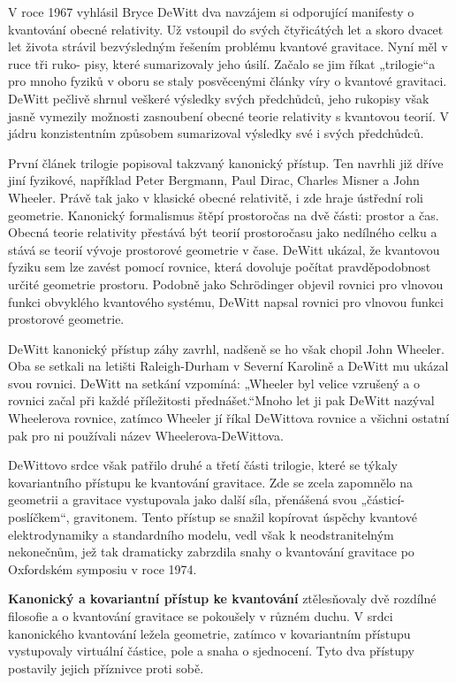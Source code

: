   V roce 1967 vyhlásil Bryce DeWitt dva navzájem si odporující manifesty o kvantování obecné
  relativity. Už vstoupil do svých čtyřicátých let a skoro dvacet let života strávil bezvýsledným
  řešením problému kvantové gravitace. Nyní měl v ruce tři ruko- pisy, které sumarizovaly jeho
  úsilí. Začalo se jim říkat „trilogie“a pro mnoho fyziků v oboru se staly posvěcenými články víry o
  kvantové gravitaci. DeWitt pečlivě shrnul veškeré výsledky svých předchůdců, jeho rukopisy však
  jasně vymezily možnosti zasnoubení obecné teorie relativity s kvantovou teorií. V jádru
  konzistentním způsobem sumarizoval výsledky své i svých předchůdců. 
  
  První článek trilogie popisoval takzvaný kanonický přístup. Ten navrhli již dříve jiní fyzikové,
  například Peter Bergmann, Paul Dirac, Charles Misner a John Wheeler. Právě tak jako v klasické
  obecné relativitě, i zde hraje ústřední roli geometrie. Kanonický formalismus štěpí prostoročas na
  dvě části: prostor a čas. Obecná teorie relativity přestává být teorií prostoročasu jako nedílného
  celku a stává se teorií vývoje prostorové geometrie v čase. DeWitt ukázal, že kvantovou fyziku sem
  lze zavést pomocí rovnice, která dovoluje počítat pravděpodobnost určité geometrie prostoru.
  Podobně jako Schrödinger objevil rovnici pro vlnovou funkci obvyklého kvantového systému, DeWitt
  napsal rovnici pro vlnovou funkci prostorové geometrie. 
  
  DeWitt kanonický přístup záhy zavrhl, nadšeně se ho však chopil John Wheeler. Oba se setkali na
  letišti Raleigh-Durham v Severní Karolině a DeWitt mu ukázal svou rovnici. DeWitt na setkání
  vzpomíná: „Wheeler byl velice vzrušený a o rovnici začal při každé příležitosti přednášet.“Mnoho
  let ji pak DeWitt nazýval Wheelerova rovnice, zatímco Wheeler jí říkal DeWittova rovnice a všichni
  ostatní pak pro ni používali název Wheelerova-DeWittova. 
  
  DeWittovo srdce však patřilo druhé a třetí části trilogie, které se týkaly kovariantního přístupu
  ke kvantování gravitace. Zde se zcela zapomnělo na geometrii a gravitace vystupovala jako další
  síla, přenášená svou „částicí-poslíčkem“, gravitonem. Tento přístup se snažil kopírovat úspěchy
  kvantové elektrodynamiky a standardního modelu, vedl však k neodstranitelným nekonečnům, jež tak
  dramaticky zabrzdila snahy o kvantování gravitace po Oxfordském symposiu v roce 1974. 
  
  \textbf{Kanonický a kovariantní přístup ke kvantování} ztělesňovaly dvě rozdílné filosofie a o
  kvantování gravitace se pokoušely v různém duchu. V srdci kanonického kvantování ležela geometrie,
  zatímco v kovariantním přístupu vystupovaly virtuální částice, pole a snaha o sjednocení. Tyto dva
  přístupy postavily jejich příznivce proti sobě. 
  
